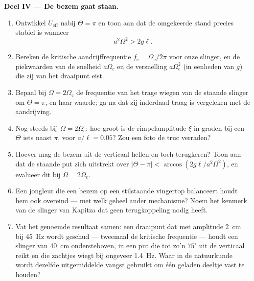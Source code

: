 \begin{problem}
\medskip\noindent\textbf{Deel IV --- De bezem gaat staan.}
\begin{enumerate}[resume]
  \item Ontwikkel $U_{\text{eff}}$ nabij $\Theta = \pi$ en toon aan dat
        de omgekeerde stand precies stabiel is wanneer
        \[
        a^2\Omega^2 > 2g\ell .
        \]
  \item Bereken de kritische aandrijffrequentie $f_{\text{c}} =
        \Omega_{\text{c}}/2\pi$ voor onze slinger, en de piekwaarden van
        de snelheid $a\Omega_{\text{c}}$ en de versnelling
        $a\Omega_{\text{c}}^2$ (in eenheden van $g$) die zij van het
        draaipunt eist.
  \item Bepaal bij $\Omega = 2\Omega_{\text{c}}$ de frequentie van het
        trage wiegen van de staande slinger om $\Theta = \pi$, en haar
        waarde; ga na dat zij inderdaad traag is vergeleken met de
        aandrijving.
  \item Nog steeds bij $\Omega = 2\Omega_{\text{c}}$: hoe groot is de
        rimpelamplitude $\xi$ in graden bij een $\Theta$ iets naast
        $\pi$, voor $a/\ell = 0.05$? Zou een foto de truc verraden?
  \item Hoever mag de bezem uit de verticaal hellen en toch terugkeren?
        Toon aan dat de staande put zich uitstrekt over $|\Theta - \pi| <
        \arccos(2g\ell/a^2\Omega^2)$, en evalueer dit bij $\Omega =
        2\Omega_{\text{c}}$.
  \item Een jongleur die een bezem op een stilstaande vingertop
        balanceert houdt hem ook overeind --- met welk geheel ander
        mechanisme? Noem het kenmerk van de slinger van Kapitza dat geen
        terugkoppeling nodig heeft.
  \item Vat het genoemde resultaat samen: een draaipunt dat met amplitude
        \qty{2}{cm} bij \qty{45}{Hz} wordt geschud --- tweemaal de
        kritische frequentie --- houdt een slinger van \qty{40}{cm}
        ondersteboven, in een put die tot zo'n $75^\circ$ uit de
        verticaal reikt en die zachtjes wiegt bij ongeveer
        \qty{1.4}{Hz}. Waar in de natuurkunde wordt dezelfde
        uitgemiddelde vangst gebruikt om één geladen deeltje vast te
        houden?
\end{enumerate}
\end{problem}

